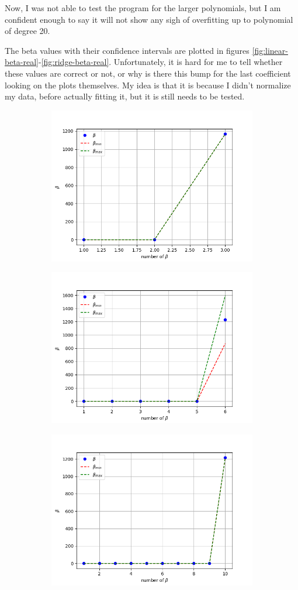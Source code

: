 Now, I was not able to test the program for the larger polynomials, but I am confident enough to say it will not show any sigh of overfitting up to polynomial of degree 20.

The beta values with their confidence intervals are plotted in figures \ref{fig:linear-beta-real}-\ref{fig:ridge-beta-real}. Unfortunately, it is hard for me to tell whether these values are correct or not, or why is there this bump for the last coefficient looking on the plots themselves. My idea is that it is because I didn't normalize my data, before actually fitting it, but it is still needs to be tested.

\begin{figure}[!ht]
\begin{subfigure}{\textwidth}
  \centering
  \includegraphics[width=0.5\linewidth]{images/real/real_linear_beta_p01_nreal.png}
\end{subfigure}
\begin{subfigure}{\textwidth}
  \centering
\includegraphics[width=0.5\linewidth]{images/real/real_ridge_beta_p02_nreal.png}
\end{subfigure}
\begin{subfigure}{\textwidth}
  \centering
\includegraphics[width=0.5\linewidth]{images/real/real_linear_beta_p03_nreal.png}

\end{subfigure}
\end{figure}
